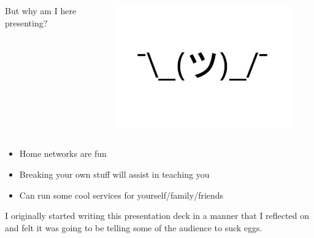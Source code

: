 \documentclass{beamer}
\begin{document}
\begin{frame}
    \begin{columns}
        \begin{column}{0.5\textwidth}
            But why am I here presenting?
        \end{column}
        \begin{column}{0.5\textwidth}
            \begin{figure}
                \centering
                \includegraphics[width=\textwidth,keepaspectratio]{../resources/shrug.jpg}
            \end{figure}
        \end{column}
    \end{columns}
\end{frame}

\begin{frame}
    \begin{itemize}
        \item Home networks are fun
        \item Breaking your own stuff will assist in teaching you
        \item Can run some cool services for yourself/family/friends
    \end{itemize}
\end{frame}

\begin{frame}
    \begin{center}
        I originally started writing this presentation deck in a manner that 
        I reflected on and felt it was going to be telling some of the audience to 
        suck eggs.
    \end{center}
\end{frame}
\end{document}
